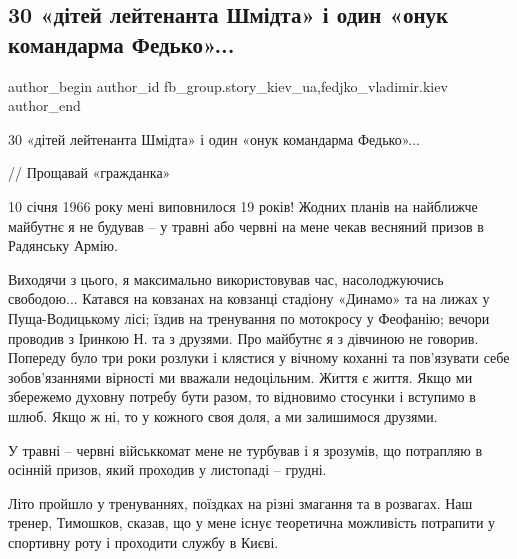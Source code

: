  
 
 
 
 
 
\subsection{30 «дітей лейтенанта Шмідта» і один «онук командарма Федько»...}
\label{sec:27_12_2021.fb.fb_group.story_kiev_ua.3.onuk_komandarma}
 
\ifcmt
 author_begin
   author_id fb_group.story_kiev_ua,fedjko_vladimir.kiev
 author_end
\fi

30 «дітей лейтенанта Шмідта» і один «онук командарма Федько»...

// Прощавай «гражданка»

10 січня 1966 року мені виповнилося 19 років! Жодних планів на найближче
майбутнє я не будував – у травні або червні на мене чекав весняний призов в
Радянську Армію.


Виходячи з цього, я максимально використовував час, насолоджуючись свободою...
Катався на ковзанах на ковзанці стадіону «Динамо» та на лижах у Пуща-Водицькому
лісі; їздив на тренування по мотокросу у Феофанію; вечори проводив з Іринкою Н.
та з друзями. Про майбутнє я з дівчиною не говорив. Попереду було три роки
розлуки і клястися у вічному коханні та пов’язувати себе зобов’язаннями
вірності ми вважали недоцільним. Життя є життя. Якщо ми збережемо духовну
потребу бути разом, то відновимо стосунки і вступимо в шлюб. Якщо ж ні, то у
кожного своя доля, а ми залишимося друзями. 


У травні – червні військкомат мене не турбував і я зрозумів, що потрапляю в
осінній призов, який проходив у листопаді – грудні.

Літо пройшло у тренуваннях, поїздках на різні змагання та в розвагах. Наш
тренер, Тимошков, сказав, що у мене існує теоретична можливість потрапити у
спортивну роту і проходити службу в Києві. 

